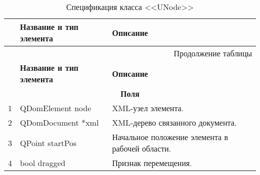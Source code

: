 \small
\singlespacing
\begin{longtable}[h]{|p{}|p{}|p{}|}
  \caption{Спецификация класса <<UNode>>}
	\\ \hline
	  \textbf{\No}                  &
	  \textbf{Название и тип элемента}  &
	  \textbf{Описание}
	\\ \hline
  \endfirsthead

  \multicolumn{3}{r}{Продолжение таблицы \thetable{}}
  \\ \hline
	  \textbf{\No}                  &
	  \textbf{Название и тип элемента}  &
	  \textbf{Описание}
	\\ \hline
  \endhead

  \multicolumn{3}{|c|}{\textbf{Поля}} \\
  \hline
  1 & QDomElement   node & XML-узел элемента.\\ \hline
  2 & QDomDocument *xml  & XML-дерево связанного документа.\\ \hline
  3 & QPoint startPos & Начальное положение элемента в рабочей области.\\ \hline
  4 & bool   dragged & Признак перемещения.\\ \hline


\end{longtable}
